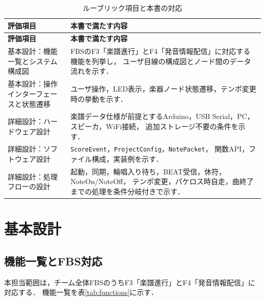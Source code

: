 \documentclass[uplatex,dvipdfmx]{jlreq}
\newcommand{\code}[1]{\texttt{#1}}
\begin{document}
\begin{longtable}{p{}p{}}
\caption{ルーブリック項目と本書の対応}\label{tab:rubric-map}\\
\toprule
\textbf{評価項目} & \textbf{本書で満たす内容} \\
\midrule
\endfirsthead
\toprule
\textbf{評価項目} & \textbf{本書で満たす内容} \\
\midrule
\endhead
基本設計：機能一覧とシステム構成図 &
FBSのF3「楽譜進行」とF4「発音情報配信」に対応する機能を列挙し，
ユーザ目線の構成図とノード間のデータ流れを示す．\\
基本設計：操作インターフェースと状態遷移 &
ユーザ操作，LED表示，楽器ノード状態遷移，テンポ変更時の挙動を示す．\\
詳細設計：ハードウェア設計 &
楽譜データ仕様が前提とするArduino，USB Serial，PC，スピーカ，WiFi接続，
追加ストレージ不要の条件を示す．\\
詳細設計：ソフトウェア設計 &
\code{ScoreEvent}，\code{ProjectConfig}，\code{NotePacket}，
関数API，ファイル構成，実装例を示す．\\
詳細設計：処理フローの設計 &
起動，同期，輪唱入り待ち，BEAT受信，休符，NoteOn/NoteOff，
テンポ変更，パケロス時自走，曲終了までの処理を条件分岐付きで示す．\\
\bottomrule
\end{longtable}

\section{基本設計}

\subsection{機能一覧とFBS対応}

本担当範囲は，チーム全体FBSのうちF3「楽譜進行」とF4「発音情報配信」に対応する．
機能一覧を表\ref{tab:functions}に示す．
\end{document}
